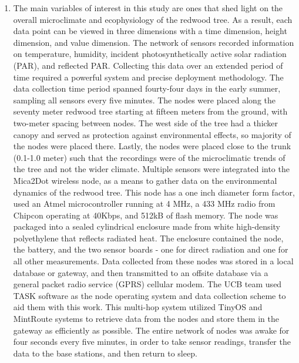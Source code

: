 \documentclass[11pt]{article}
\begin{document}
\begin{enumerate}[label=(\alph*)]
\item The main variables of interest in this study are ones that shed light on the overall microclimate and ecophysiology of the redwood tree. As a result, each data point can be viewed in three dimensions with a time dimension, height dimension, and value dimension. The network of sensors recorded information on temperature, humidity, incident photosynthetically active solar radiation (PAR), and reflected PAR. Collecting this data over an extended period of time required a powerful system and precise deployment methodology. The data collection time period spanned fourty-four days in the early summer, sampling all sensors every five minutes. The nodes were placed along the seventy meter redwood tree starting at fifteen meters from the ground, with two-meter spacing between nodes. The west side of the tree had a thicker canopy and served as protection against environmental effects, so majority of the nodes were placed there. Lastly, the nodes were placed close to the trunk (0.1-1.0 meter) such that the recordings were of the microclimatic trends of the tree and not the wider climate.
Multiple sensors were integrated into the Mica2Dot wireless node, as a means to gather data on the environmental dynamics of the redwood tree. This node has a one inch diameter form factor, used an Atmel microcontroller running at 4 MHz, a 433 MHz radio from Chipcon operating at 40Kbps, and 512kB of flash memory. The node was packaged into a sealed cylindrical enclosure made from white high-density polyethylene that reflects radiated heat. The enclosure contained the node, the battery, and the two sensor boards - one for direct radiation and one for all other measurements. Data collected from these nodes was stored in a local database or gateway, and then transmitted to an offsite database via a general packet radio service (GPRS) cellular modem. The UCB team used TASK software as the node operating system and data collection scheme to aid them with this work. This multi-hop system utilized TinyOS and MintRoute systems to retrieve data from the nodes and store them in the gateway as efficiently as possible. The entire network of nodes was awake for four seconds every five minutes, in order to take sensor readings, transfer the data to the base stations, and then return to sleep.

\end{enumerate}
\end{document}
